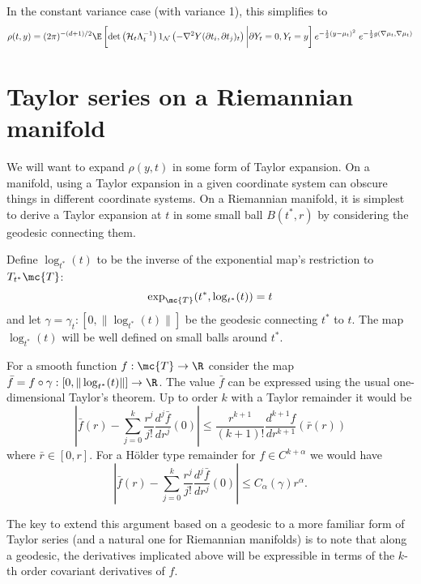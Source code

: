 \documentclass{article}
\begin{document}
In the constant variance case (with variance 1), this simplifies to
$$
\begin{aligned}
\rho(t,y) = (2\pi)^{-(d+1)/2}  \E \left[\det\left({\cal H}_t\Lambda_t^{-1}\right) 1_{{\cal N}}\left(-\nabla^2 Y(\partial t_i, \partial t_j)_t \right) \biggl \vert \partial Y_t=0, Y_t=y\right] e^{-\frac{1}{2}(y-\mu_t)^2} \; e^{-\frac{1}{2}g(\nabla \mu_t,\nabla \mu_t)}
\end{aligned}
$$

\section{Taylor series on a Riemannian manifold}


We will want to expand $\rho(y,t)$ in some form of Taylor
expansion. On a manifold, using a Taylor expansion in a given
coordinate system can obscure things in different coordinate
systems. On a Riemannian manifold, it is simplest to derive a Taylor expansion
at $t$ in some small ball $B(t^*,r)$ by considering the geodesic connecting them.

Define $\log_{t^*}(t)$ to be the inverse of the exponential map's restriction to $T_{t^*}\mc{T}$:
$$
\exp_{\mc{T}}(t^*, \log_{t^*}(t)) = t
$$
and let $\gamma = \gamma_t:[0, \|\log_{t^*}(t)\|]$ be the geodesic connecting $t^*$ to $t$. The map $\log_{t^*}(t)$ will be well defined
on small balls around $t^*$.

For a smooth function $f:\mc{T} \rightarrow \R$ consider the map $\bar{f} = f \circ \gamma: [0, \|\log_{t^*}(t)\|] \rightarrow \R$.
The value $\bar{f}$ can be expressed using the usual one-dimensional Taylor's theorem. Up to order $k$ with a Taylor remainder it would be
$$
 \left|\bar{f}(r) - \sum_{j=0}^k \frac{r^j}{j!} \frac{d^j\bar{f}}{dr^j}(0) \right| \leq  \frac{r^{k+1}}{(k+1)!}\frac{d^{k+1}f}{dr^{k+1}} (\bar{r}(r))
$$
where $\bar{r} \in [0, r]$. For a H\"older type remainder for $f \in C^{k+\alpha}$ we would have
$$
 \left|\bar{f}(r) - \sum_{j=0}^k \frac{r^j}{j!} \frac{d^j\bar{f}}{dr^j}(0) \right| \leq  C_{\alpha}(\gamma) r^{\alpha}.
$$

 The key to extend this argument based on a geodesic to a more familiar form of Taylor series (and a natural one for Riemannian manifolds)
 is to note that along a geodesic, the derivatives implicated above will be expressible in terms of the $k$-th order covariant
 derivatives of $f$.
\end{document}
